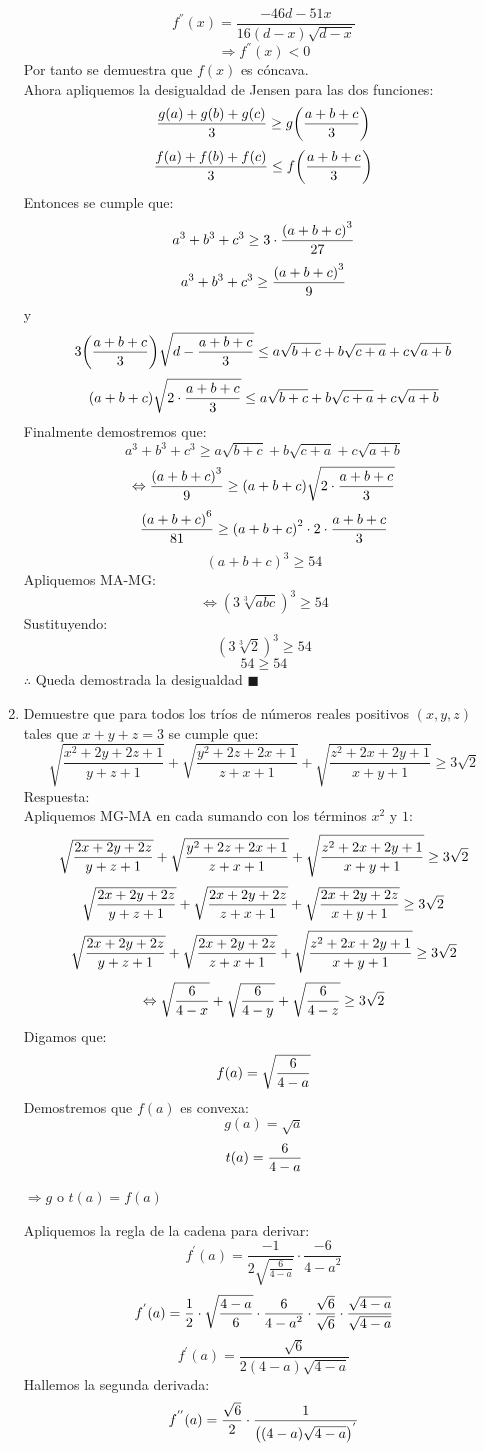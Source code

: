 \documentclass{book}
\begin{document}
\begin{enumerate}
$$f^{''}(x)=\frac{-46d-51x}{16(d-x) \sqrt{d-x}}$$
$$\Rightarrow f^{''}(x)<0$$
Por tanto se demuestra que $f(x)$ es cóncava.\\
Ahora apliquemos la desigualdad de Jensen para las dos funciones:
$$\frac{g(a)+g(b)+g(c)}{3}\geq g\bigg({a+b+c\over 3}\bigg)$$
$$\frac{f(a)+f(b)+f(c)}{3}\leq f\bigg({a+b+c\over 3}\bigg)$$
Entonces se cumple que:
$$a^3+b^3+c^3\geq 3\cdot{{(a+b+c)}^3\over 27}$$
$$a^3+b^3+c^3\geq {{(a+b+c)}^3\over 9}$$
y
$$3\bigg({a+b+c\over 3}\bigg) \sqrt{d-{a+b+c\over 3}}\leq a\sqrt{b+c}+b\sqrt{c+a}+c\sqrt{a+b}$$
$$(a+b+c) \sqrt{2\cdot{a+b+c\over 3}}\leq a\sqrt{b+c}+b\sqrt{c+a}+c\sqrt{a+b}$$
Finalmente demostremos que:
$$a^3+b^3+c^3\geq a\sqrt{b+c}+b\sqrt{c+a}+c\sqrt{a+b}$$
$$\Leftrightarrow {{(a+b+c)}^3\over 9}\geq (a+b+c) \sqrt{2\cdot{a+b+c\over 3}}$$
$${{(a+b+c)}^6\over 81}\geq{(a+b+c)}^2\cdot 2\cdot{a+b+c\over 3}$$
$${(a+b+c)}^3\geq 54$$
Apliquemos MA-MG:
$$\Leftrightarrow {(3\sqrt[3]{abc})}^3\geq 54$$
Sustituyendo:
$${(3\sqrt[3]{2})}^3\geq 54$$
$$54\geq 54$$
$\therefore$ Queda demostrada la desigualdad $\blacksquare$\\
				\item Demuestre que para todos los tríos de números reales positivos $(x,y,z)$ tales que $x+y+z= 3$ se cumple que:
			$$\sqrt{\frac{x^2+2y+2z+1}{y+z+1}}+\sqrt{\frac{y^2+2z+2x+1}{z+x+1}}+\sqrt{\frac{z^2+2x+2y+1}{x+y+1}}\geq3\sqrt{2}$$ 
			Respuesta:\\
			Apliquemos MG-MA en cada sumando con los términos $x^2$ y $1$:
$$\sqrt{{2x+2y+2z\over y+z+1}}+\sqrt{\frac{y^2+2z+2x+1}{z+x+1}}+\sqrt{\frac{z^2+2x+2y+1}{x+y+1}}\geq3\sqrt{2}$$
$$\sqrt{{2x+2y+2z\over y+z+1}}+\sqrt{{2x+2y+2z\over z+x+1}}+\sqrt{{2x+2y+2z\over x+y+1}}\geq 3\sqrt{2}$$
$$\sqrt{{2x+2y+2z\over y+z+1}}+\sqrt{{2x+2y+2z\over z+x+1}}+\sqrt{\frac{z^2+2x+2y+1}{x+y+1}}\geq3\sqrt{2}$$
$$\Leftrightarrow\sqrt{{6\over 4-x}}+\sqrt{{6\over 4-y}}+\sqrt{{6\over 4-z}}\geq 3\sqrt{2}$$
Digamos que:
$$f(a)=\sqrt{{6\over 4-a}}$$
Demostremos que $f(a)$ es convexa:
$$g(a)=\sqrt{a}$$
$$t(a)={6\over 4-a}$$
					\begin{center}
						$\Rightarrow g$ o $ t(a)=f(a)$
					\end{center}
					Apliquemos la regla de la cadena para derivar:
$$f^{'} (a)=\frac{-1}{2\sqrt{\frac{6}{4-a}}}\cdot\frac{-6}{{4-a}^2}$$ 
$$f^{'} (a)={1\over 2}\cdot\sqrt{\frac{4-a}{6}}\cdot\frac{6}{{4-a}^2} \cdot{\sqrt{6}\over\sqrt{6}}\cdot{\sqrt{4-a}\over\sqrt{4-a}}$$
$$f^{'} (a)=\frac{\sqrt{6}}{2(4-a) \sqrt{4-a}}$$
Hallemos la segunda derivada:
$$f^{''} (a)={\sqrt{6}\over 2}\cdot\frac{1}{{\big((4-a)\sqrt{4-a}\big)}^{'}}$$

\end{enumerate}
\end{document}
